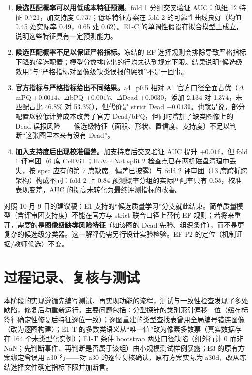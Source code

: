 \documentclass[11pt,a4paper,UTF8,fontset=fandol]{ctexart}
\begin{document}
\begin{enumerate}
\item \textbf{候选匹配概率可以用低成本特征预测。}fold 1 分组交叉验证 AUC：低维 12 特征 0.721，加支持度 0.737；低维特征方案在 fold 2 的可靠性曲线良好（均值 0.45 处实际率 0.49，0.65 处 0.62）。E1-C 的单调性假设在拟合模型上成立，说明这些特征具有一定预测能力。
\item \textbf{候选匹配概率不足以保证严格指标。}冻结的 EF 选择规则会排除导致严格指标下降的候选配置；模型分数排序出的行均未达到规定下限。结果说明“候选级效用”与“严格指标对图像级缺类误报的惩罚”不是一回事。
\item \textbf{官方指标与严格指标给出不同结果。}a4\_p0.5 相对 A1 官方口径全面占优（$\Delta$mPQ $+0.0014$、$\Delta$bPQ $+0.0017$、$\Delta$Dead $+0.0030$，添加 2,134 对 1,374，未匹配占比 46.8\% 对 53.3\%），但代价是 strict Dead $-0.0130$。也就是说，部分配置以较低计算成本改善了官方 Dead/bPQ，但同时增加了缺类图像上的 Dead 误报风险——候选级特征（面积、形状、置信度、支持度）不足以判断“这张图里本来有没有 Dead”。
\item \textbf{加入支持度后出现校准偏差。}加支持度后交叉验证 AUC 提升 $+0.016$，但 fold 1 评审团（6 席 CellViT；HoVer-Net split 2 检查点已在两机磁盘清理中丢失，按 spec 应有的第 7 席缺席，偏差已披露）与 fold 2 评审团（13 席跨折跨架构）构成不同：fold 2 上 0.84 预测概率分组的实际匹配率只有 0.58，校准表现变差，AUC 的提高未转化为最终评测指标的改善。
\end{enumerate}

对照 10 月 9 日的建议稿：E1 支持的“候选质量学习”分支就此结束。简单质量模型（含评审团支持度）不能在官方与 strict 联合口径上替代 EF 规则；若将来重开，需要的是\textbf{图像级缺类风险特征}（如该图的 Dead 先验、组织条件），而不是更复杂的候选级分类器。这一解释仍需另行设计实验检验。EF-P2 的定位（机制证据/教师候选）不变。

\section{过程记录、复核与测试}

本阶段的实现遵循先编写测试、再实现功能的流程，测试与一致性检查发现了多处缺陷，修复后均重新运行。主要问题包括：分型探针的类别索引偏移一位（缓存标签行确定性修复后特征逐位一致）；逐图重建的类型查找表曾用全局编号错连图像（改为逐图构建）；E1-T 的多数类语义从“唯一值”改为像素多数票（真实数据存在 164 个未类型化实例）；E1-T 条件 bootstrap 两处口径缺陷（组外行计 0 而非 NaN；先判断事件、再判断是否属于该组）由小规模测试样例暴露；E3 的原有方案绑定曾误用 a30 行——对 a30 的逐位复核确认，原有方案实际为 a30d，改从冻结选择文件确定指标下限并加断言。
\end{document}

